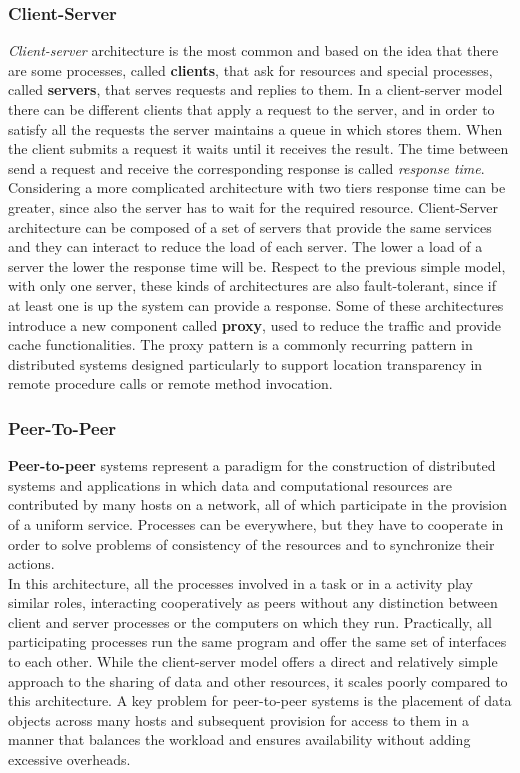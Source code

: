\subsubsection{Client-Server}
\textit{Client-server} architecture is the most common and based on the idea that there are some processes, called \textbf{clients}, that ask for resources and special processes, called \textbf{servers}, that serves requests and replies to them. In a client-server model there can be different clients that apply a request to the server, and in order to satisfy all the requests the server maintains a queue in which stores them. When the client submits a request it waits until it receives the result. The time between send a request and receive the corresponding response is called \textit{response time}.
Considering a more complicated architecture with two tiers response time can be greater, since also the server has to wait for the required resource.
Client-Server architecture can be composed of a set of servers that provide the same services and they can interact to reduce the load of each server. The lower a load of a server the lower the response time will be. Respect to the previous simple model, with only one server, these kinds of architectures are also fault-tolerant, since if at least one is up the system can provide a response.
Some of these architectures introduce a new component called \textbf{proxy}, used to reduce the traffic and provide cache functionalities. The proxy pattern is a commonly recurring pattern in distributed systems designed particularly to support location transparency in remote procedure calls or remote method invocation.

\subsubsection{Peer-To-Peer}
\textbf{Peer-to-peer} systems represent a paradigm for the construction of distributed systems and applications in which data and computational resources are contributed by many hosts on a network, all of which participate in the provision of a uniform service.
Processes can be everywhere, but they have to cooperate in order to solve problems of consistency of the resources and to synchronize their actions.\\
In this architecture, all the processes involved in a task or in a activity play similar roles, interacting cooperatively as peers without any distinction between client and server processes or the computers on which they run. Practically, all participating processes run the same program and offer the same set of interfaces to each other. While the client-server model offers a direct and relatively simple approach to the sharing of data and other resources, it scales poorly compared to this architecture.
A key problem for peer-to-peer systems is the placement of data objects across many hosts and subsequent provision for access to them in a manner that balances the workload and ensures availability without adding excessive overheads.

